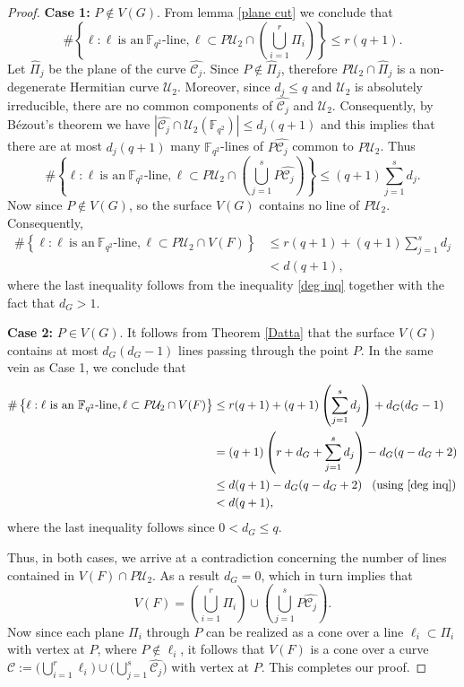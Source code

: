 \documentclass[10pt,a4paper,oneside]{amsproc}
\newcommand{\Fqt}{\mathbb{F}_{q^2}}
\newcommand{\C}{\mathcal{C}}
\newcommand{\U}{\mathcal{U}}
\begin{document}
\begin{proof}
  \textbf{Case 1:} $P\notin V(G)$. From lemma \ref{plane cut} we conclude that $$\#\left\{\ell: \ell \ \text{is an}\ \Fqt\text{-line}, \ell\subset P\U_2\cap \left(\bigcup_{i=1}^r\Pi_i\right)\right\}\leq r(q+1).$$ Let $\widehat{\Pi}_j$ be the plane of the curve $\widehat{\C_j}$. Since $P\notin \widehat{\Pi}_j$, therefore $P\U_2\cap\widehat{\Pi}_j$ is a non-degenerate Hermitian curve $\U_2$. Moreover, since $d_j\leq q$ and $\U_2$ is absolutely irreducible, there are no common components of $\widehat{\C_j}$ and $\U_2$. Consequently, by B\'{e}zout's theorem we have $|\widehat{\C_j}\cap \U_2(\Fqt)|\leq d_j(q+1)$ and this implies that there are at most $d_j(q+1)$ many $\Fqt$-lines of $P\widehat{\C_j}$ common to $P\U_2$. Thus $$\#\left\{\ell: \ell \ \text{is an}\ \Fqt\text{-line}, \ell\subset P\U_2\cap \left(\bigcup_{j=1}^s P\widehat{\C_j}\right)\right\}\leq (q+1)\sum_{j=1}^s d_j.$$ Now since $P\notin V(G)$, so the surface $V(G)$ contains no line of $P\U_2$. Consequently, 
  \begin{align*}
     \#\left\{\ell: \ell \ \text{is an}\ \Fqt\text{-line}, \ell\subset P\U_2\cap V(F)\right\} &\leq r(q+1)+(q+1)\sum_{j=1}^s d_j\\
     &< d(q+1),
  \end{align*}
 where the last inequality follows from the inequality \eqref{deg inq} together with the fact that $d_G>1$.

\textbf{ Case 2:} $P\in V(G)$. It follows from Theorem \ref{Datta} that the surface $V(G)$ contains at most $d_G(d_G-1)$ lines passing through the point $P$. In the same vein as Case 1, we conclude that
\begin{align*}
  \#\left\{\ell: \ell \ \text{is an}\ \Fqt\text{-line}, \ell\subset P\U_2\cap V(F)\right\} &\leq  r(q+1)+(q+1)\left(\sum_{j=1}^s d_j\right)+d_G(d_G-1)\\
  &= (q+1)\left(r+d_G+\sum_{j=1}^sd_j\right)-d_G(q-d_G+2)\\
  &\leq d(q+1)-d_G(q-d_G+2) \ \ \left(\text{using}\ \eqref{deg inq}\right)\\
  &<d(q+1),
\end{align*}
where the last inequality follows since $0<d_G\leq q$. 

Thus, in both cases, we arrive at a contradiction concerning the number of lines contained in $V(F)\cap P\U_2$. As a result $d_G=0$, which in turn implies that $$V(F)=\left(\bigcup_{i=1}^r \Pi_i\right)\cup \left(\bigcup_{j=1}^s P\widehat{\C_j}\right).$$ Now since each plane $\Pi_i$ through $P$ can be realized as a cone over a line $\ell_i\subset\Pi_i$ with vertex at $P$, where $P\notin \ell_i$, it follows that $V(F)$ is a cone over a curve $\C:=\Big(
\bigcup_{i=1}^r \ell_i
\Big)\cup\Big(\bigcup_{j=1}^s \widehat{\mathcal{C}_j}\Big)$ with vertex at $P$. This completes our proof.


\end{proof}
\end{document}
